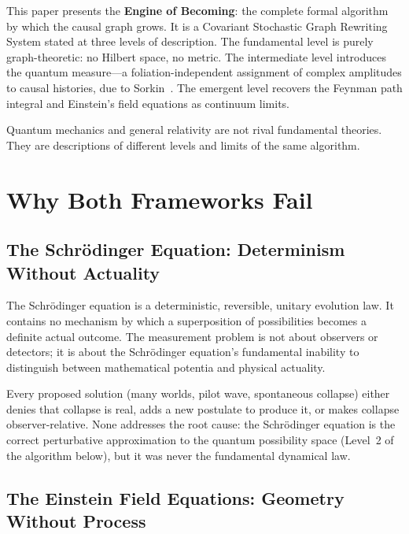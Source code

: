 \documentclass[11pt,a4paper]{article}
\theoremstyle{plain}
\theoremstyle{definition}
\theoremstyle{remark}
\begin{document}
This paper presents the \textbf{Engine of Becoming}: the complete formal algorithm
by which the causal graph grows. It is a Covariant Stochastic Graph Rewriting
System stated at three levels of description. The fundamental level is purely
graph-theoretic: no Hilbert space, no metric. The intermediate level introduces
the quantum measure---a foliation-independent assignment of complex amplitudes to
causal histories, due to Sorkin~\citep{Sorkin1994}. The emergent level recovers
the Feynman path integral and Einstein's field equations as continuum limits.

Quantum mechanics and general relativity are not rival fundamental theories. They
are descriptions of different levels and limits of the same algorithm.

\section{Why Both Frameworks Fail}
\label{sec:failure}

\subsection{The Schr\"{o}dinger Equation: Determinism Without Actuality}

The Schr\"{o}dinger equation is a deterministic, reversible, unitary evolution
law. It contains no mechanism by which a superposition of possibilities becomes
a definite actual outcome. The measurement problem is not about observers or
detectors; it is about the Schr\"{o}dinger equation's fundamental inability to
distinguish between mathematical potentia and physical actuality.

Every proposed solution (many worlds, pilot wave, spontaneous collapse) either
denies that collapse is real, adds a new postulate to produce it, or makes collapse
observer-relative. None addresses the root cause: the Schr\"{o}dinger equation is
the correct perturbative approximation to the quantum possibility space (Level~2
of the algorithm below), but it was never the fundamental dynamical law.

\subsection{The Einstein Field Equations: Geometry Without Process}
\end{document}

